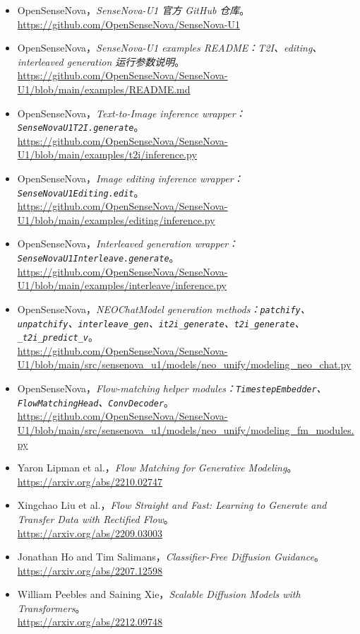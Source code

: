 \begingroup
\small
\sloppy
\begin{itemize}[leftmargin=1.5em]
  \item OpenSenseNova，\emph{SenseNova-U1 官方 GitHub 仓库}。\\
  \url{https://github.com/OpenSenseNova/SenseNova-U1}
  \item OpenSenseNova，\emph{SenseNova-U1 examples README：T2I、editing、interleaved generation 运行参数说明}。\\
  \url{https://github.com/OpenSenseNova/SenseNova-U1/blob/main/examples/README.md}
  \item OpenSenseNova，\emph{Text-to-Image inference wrapper：\texttt{SenseNovaU1T2I.generate}}。\\
  \url{https://github.com/OpenSenseNova/SenseNova-U1/blob/main/examples/t2i/inference.py}
  \item OpenSenseNova，\emph{Image editing inference wrapper：\texttt{SenseNovaU1Editing.edit}}。\\
  \url{https://github.com/OpenSenseNova/SenseNova-U1/blob/main/examples/editing/inference.py}
  \item OpenSenseNova，\emph{Interleaved generation wrapper：\texttt{SenseNovaU1Interleave.generate}}。\\
  \url{https://github.com/OpenSenseNova/SenseNova-U1/blob/main/examples/interleave/inference.py}
  \item OpenSenseNova，\emph{NEOChatModel generation methods：\texttt{patchify}、\texttt{unpatchify}、\texttt{interleave\_gen}、\texttt{it2i\_generate}、\texttt{t2i\_generate}、\texttt{\_t2i\_predict\_v}}。\\
  \url{https://github.com/OpenSenseNova/SenseNova-U1/blob/main/src/sensenova_u1/models/neo_unify/modeling_neo_chat.py}
  \item OpenSenseNova，\emph{Flow-matching helper modules：\texttt{TimestepEmbedder}、\texttt{FlowMatchingHead}、\texttt{ConvDecoder}}。\\
  \url{https://github.com/OpenSenseNova/SenseNova-U1/blob/main/src/sensenova_u1/models/neo_unify/modeling_fm_modules.py}
  \item Yaron Lipman et al.，\emph{Flow Matching for Generative Modeling}。\\
  \url{https://arxiv.org/abs/2210.02747}
  \item Xingchao Liu et al.，\emph{Flow Straight and Fast: Learning to Generate and Transfer Data with Rectified Flow}。\\
  \url{https://arxiv.org/abs/2209.03003}
  \item Jonathan Ho and Tim Salimans，\emph{Classifier-Free Diffusion Guidance}。\\
  \url{https://arxiv.org/abs/2207.12598}
  \item William Peebles and Saining Xie，\emph{Scalable Diffusion Models with Transformers}。\\
  \url{https://arxiv.org/abs/2212.09748}
\end{itemize}
\endgroup
